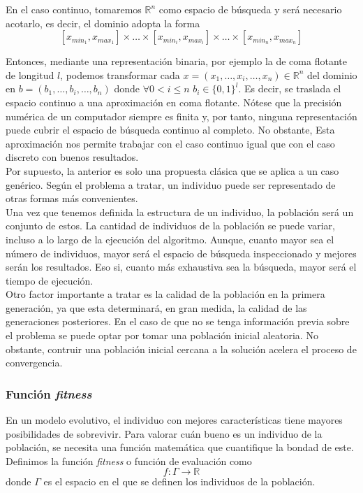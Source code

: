 			En el caso continuo, tomaremos ${\mathbb{R}^n}$ como espacio de b\'usqueda y ser\'a necesario acotarlo, es decir, el dominio adopta la forma \\
			\[[x_{min_1}, x_{max_1}]\times\dots\times[x_{min_i},x_{max_i}]\times\dots\times[x_{min_n},x_{max_n}]\]
			
			Entonces, mediante una representaci\'on binaria, por ejemplo la de coma flotante de longitud $l$, podemos transformar cada $x=(x_1,\dots,x_i,\dots,x_n) \in \mathbb{R}^n$ del dominio en $b=(b_1,\dots,b_i,\dots,b_n)$ donde $\forall  0<i\leq n$ $b_i \in \{0,1\}^l$. Es decir, se traslada el espacio continuo a una aproximaci\'on en coma flotante. N\'otese que la precisi\'on num\'erica de un computador siempre es finita y, por tanto, ninguna representaci\'on puede cubrir el espacio de b\'usqueda continuo al completo. No obstante, Esta aproximaci\'on nos permite trabajar con el caso continuo igual que con el caso discreto con buenos resultados.\\
			
			Por supuesto, la anterior es solo una propuesta cl\'asica que se aplica a un caso gen\'erico. Seg\'un el problema a tratar, un individuo puede ser representado de otras formas m\'as convenientes.\\
			
			Una vez que tenemos definida la estructura de un individuo, la poblaci\'on ser\'a un conjunto de estos. La cantidad de individuos de la poblaci\'on se puede variar, incluso a lo largo de la ejecuci\'on del algoritmo. Aunque, cuanto mayor sea el n\'umero de individuos, mayor ser\'a el espacio de b\'usqueda inspeccionado y mejores ser\'an los resultados. Eso si, cuanto m\'as exhaustiva sea la b\'usqueda, mayor ser\'a el tiempo de ejecuci\'on.\\
			
			Otro factor importante a tratar es la calidad de la poblaci\'on en la primera generaci\'on, ya que esta determinar\'a, en gran medida, la calidad de las generaciones posteriores. En el caso de que no se tenga informaci\'on previa sobre el problema se puede optar por tomar una poblaci\'on inicial aleatoria. No obstante, contruir una poblaci\'on inicial cercana a la soluci\'on acelera el proceso de convergencia. \\
				
			\subsubsection{Funci\'on \textit{fitness}}
			En un modelo evolutivo, el individuo con mejores caracter\'isticas tiene mayores posibilidades de sobrevivir. Para valorar cu\'an bueno es un individuo de la poblaci\'on, se necesita una funci\'on matem\'atica que cuantifique la bondad de este. Definimos la funci\'on \textit{fitness} o funci\'on de evaluaci\'on como 
			\[f:\Gamma\rightarrow\mathbb{R}\]
			donde $\Gamma$ es el espacio en el que se definen los individuos de la poblaci\'on.\\
			
